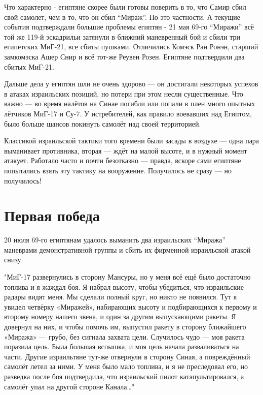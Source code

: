 Что характерно - египтяне скорее были готовы поверить в то, что Самир сбил свой самолет, чем в то, что он сбил “Мираж”. Но это частности. А текущие события подтверждали большие проблемы египтян - 21 мая 69-го “Миражи” всё той же 119-й эскадрильи затянули в ближний маневренный бой и сбили три египетских МиГ-21, все сбиты пушками. Отличились Комэск Ран Ронэн, старший замкомэска Ашер Снир и всё тот-же Реувен Розен. Египтяне подтвердили два сбитых МиГ-21.

Дальше дела у египтян шли не очень здорово — он достигали некоторых успехов в атаках израильских позиций, но потери при этом несли существенные. Что важно — во время налётов на Синае погибли или попали в плен много опытных лётчиков МиГ-17 и Су-7. У истребителей, как правило воевавших над Египтом, было больше шансов покинуть самолёт над своей территорией.

Классикой израильской тактики того времени были засады в воздухе — одна пара выманивает противника, вторая — ждёт на малой высоте, и в нужный момент атакует. Работало часто и почти безотказно — правда, вскоре сами египтяне попытались взять эту тактику на вооружение. Получилось не сразу — но получилось! 

\section{Первая победа}

20 июля 69-го египтянам удалось выманить два израильских “Миража” маневрами демонстративной группы и сбить их фирменной израильской атакой снизу. 

\begin{textcitation}
	"МиГ-17 развернулись в сторону Мансуры, но у меня всё ещё было достаточно топлива и я жаждал боя. Я набрал высоту, чтобы убедиться, что израильские радары видят меня. Мы сделали полный круг, но никто не появился. Тут я увидел четвёрку «Миражей», набирающих высоту и подбирающихся к первому и второму номеру нашего звена, и один за другим выпускающими ракеты. Я довернул на них, и чтобы помочь им, выпустил ракету в сторону ближайшего «Миража» — грубо, без сигнала захвата цели. Случилось чудо — моя ракета поразила цель. Была большая вспышка, и моя цель начала разваливаться на части. Другие израильтяне тут-же отвернули в сторону Синая, а повреждённый самолёт летел за ними. У меня было мало топлива, и я не преследовал его, но разведка после боя подтвердила, что израильский пилот катапультировался, а самолёт упал на другой стороне Канала…"
\end{textcitation}

